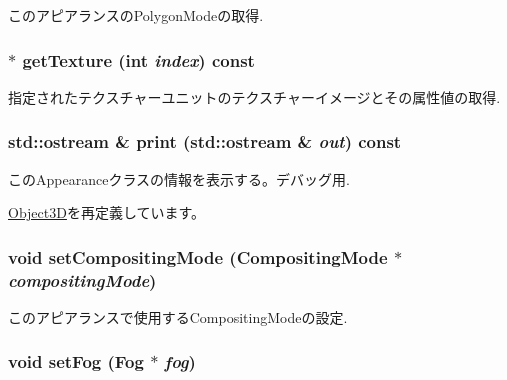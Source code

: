 このアピアランスのPolygonModeの取得. \hypertarget{classm3g_1_1Appearance_987cc21bd78d0e4e664da717479bdd57}{
\subsubsection[{getTexture}]{ $\ast$ getTexture (int {\em index}) const}}
\label{classm3g_1_1Appearance_987cc21bd78d0e4e664da717479bdd57}


指定されたテクスチャーユニットのテクスチャーイメージとその属性値の取得. \hypertarget{classm3g_1_1Appearance_6fea17fa1532df3794f8cb39cb4f911f}{
\subsubsection[{print}]{\setlength{\rightskip}{0pt plus 5cm}std::ostream \& print (std::ostream \& {\em out}) const}}
\label{classm3g_1_1Appearance_6fea17fa1532df3794f8cb39cb4f911f}


このAppearanceクラスの情報を表示する。デバッグ用. 

\hyperlink{classm3g_1_1Object3D_6fea17fa1532df3794f8cb39cb4f911f}{Object3D}を再定義しています。\hypertarget{classm3g_1_1Appearance_b4dbfc0232132aeb0a7b7c5eaade82e1}{
\subsubsection[{setCompositingMode}]{\setlength{\rightskip}{0pt plus 5cm}void setCompositingMode ({\bf CompositingMode} $\ast$ {\em compositingMode})}}
\label{classm3g_1_1Appearance_b4dbfc0232132aeb0a7b7c5eaade82e1}


このアピアランスで使用するCompositingModeの設定. \hypertarget{classm3g_1_1Appearance_bc1a612006d6b4c3d443ff6ab542c788}{
\subsubsection[{setFog}]{\setlength{\rightskip}{0pt plus 5cm}void setFog ({\bf Fog} $\ast$ {\em fog})}}
\label{classm3g_1_1Appearance_bc1a612006d6b4c3d443ff6ab542c788}


